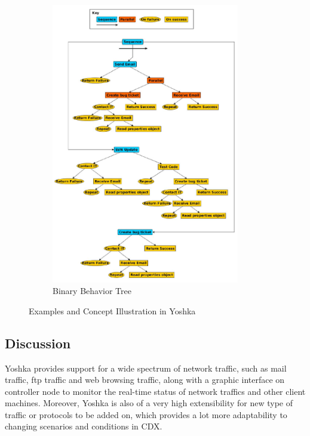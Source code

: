 \documentclass[12pt]{report}
\begin{document}
\begin{figure}[h!]
\begin{subfigure}[b]{0.45\linewidth}
	\includegraphics[width=0.9\textwidth]{./pictures/yoshka-bbt}
    \caption{Binary Behavior Tree}
  \end{subfigure}
  \caption{Examples and Concept Illustration in Yoshka}
\end{figure}

\subsection{Discussion}

Yoshka provides support for a wide spectrum of network traffic, such as mail traffic, ftp traffic and web browsing traffic, along with a graphic interface on controller node to monitor the real-time status of network traffics and other client machines. Moreover, Yoshka is also of a very high extensibility for new type of traffic or protocols to be added on, which provides a lot more adaptability to changing scenarios and conditions in CDX.\\
\end{document}
